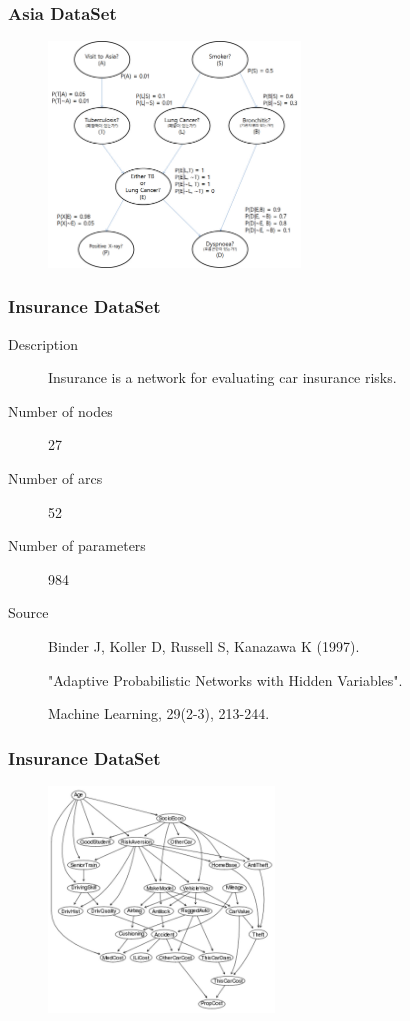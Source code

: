 \documentclass{beamer}
\begin{document}
\begin{frame}
\frametitle{Asia DataSet}
{\scriptsize{}
	\begin{figure}
		\includegraphics[height=170pt]{images/Model_Real_Asia}
	\end{figure}	
}
\end{frame}



\begin{frame}
\frametitle{Insurance DataSet}
{\scriptsize{}
\begin{description}
	\item[Description] Insurance is a network for evaluating car insurance risks.
	
	\item[Number of nodes] 27
	
	\item[Number of arcs] 52
	
	\item[Number of parameters] 984
	
	\item[Source]  Binder J, Koller D, Russell S, Kanazawa K (1997).

	 "Adaptive Probabilistic Networks with Hidden Variables".
	 
	  Machine Learning, 29(2-3), 213-244.
\end{description}
}
\end{frame}



\begin{frame}
\frametitle{Insurance DataSet}
{\scriptsize{}
	\begin{figure}
		\includegraphics[height=170pt]{images/Model_Real_Insurance}
	\end{figure}	
}
\end{frame}
\end{document}
